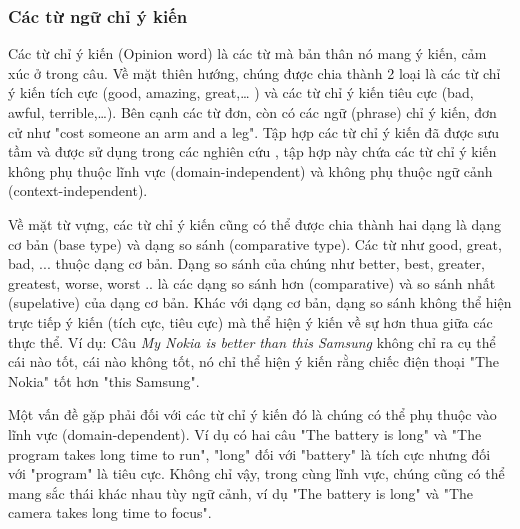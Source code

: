\documentclass[12pt]{extarticle}
\begin{document}
			\subsubsection*{Các từ ngữ chỉ ý kiến}	
				\par Các từ chỉ ý kiến (Opinion word) là các từ mà bản thân nó mang ý kiến, cảm xúc ở trong câu. Về mặt thiên hướng, chúng được chia thành 2 loại là các từ chỉ ý kiến tích cực (good, amazing, great,… ) và các từ chỉ ý kiến tiêu cực (bad, awful, terrible,…). Bên cạnh các từ đơn, còn có các ngữ (phrase) chỉ ý kiến, đơn cử như "cost someone an arm and a leg". Tập hợp các từ chỉ ý kiến đã được sưu tầm và được sử dụng trong các nghiên cứu \cite{sentiment}, tập hợp này chứa các từ chỉ ý kiến không phụ thuộc lĩnh vực (domain-independent) và không phụ thuộc ngữ cảnh (context-independent).	
				\par Về mặt từ vựng, các từ chỉ ý kiến cũng có thể được chia thành hai dạng là dạng cơ bản (base type) và dạng so sánh (comparative type). Các từ như good, great, bad, ... thuộc dạng cơ bản. Dạng so sánh của chúng như better, best, greater, greatest, worse, worst .. là các dạng so sánh hơn (comparative) và so sánh nhất (supelative) của dạng cơ bản. Khác với dạng cơ bản, dạng so sánh không thể hiện trực tiếp ý kiến (tích cực, tiêu cực) mà thể hiện ý kiến về sự hơn thua giữa các thực thể. Ví dụ: Câu \textit{My Nokia is better than this Samsung} không chỉ ra cụ thể cái nào tốt, cái nào không tốt, nó chỉ thể hiện ý kiến rằng chiếc điện thoại "The Nokia" tốt hơn "this Samsung".
				\par Một vấn đề gặp phải đối với các từ chỉ ý kiến đó là chúng có thể phụ thuộc vào lĩnh vực (domain-dependent). Ví dụ có hai câu "The battery is long" và "The program takes long time to run", "long" đối với "battery" là tích cực nhưng đối với "program" là tiêu cực. Không chỉ vậy, trong cùng lĩnh vực, chúng cũng có thể mang sắc thái khác nhau tùy ngữ cảnh, ví dụ "The battery is long" và "The camera takes long time to focus".	
\end{document}
